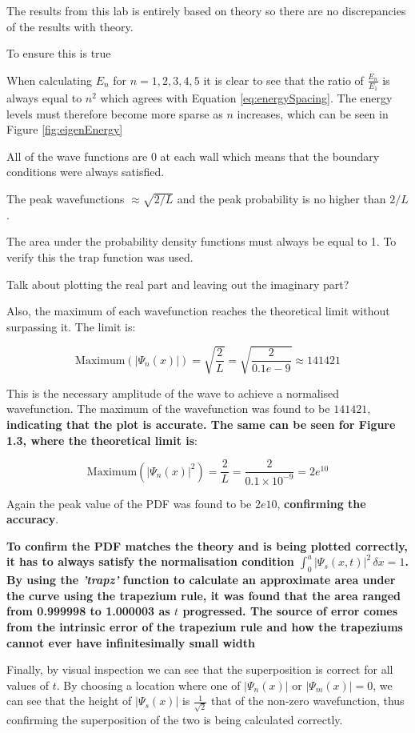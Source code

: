 The results from this lab is entirely based on theory so there are no discrepancies of the results with theory.

To ensure this is true 

When calculating $E_n$ for $n=1,2,3,4,5$ it is clear to see that the ratio of $\frac{E_n}{E_1}$ is always equal to $n^{2}$ which agrees with Equation \ref{eq:energySpacing}. The energy levels must therefore become more sparse as $n$ increases, which can be seen in Figure \ref{fig:eigenEnergy}

All of the wave functions are 0 at each wall which means that the boundary conditions were always satisfied.

The peak wavefunctions $\approx \sqrt{2/L}$ and the peak probability is no higher than $2/L$.

The area under the probability density functions must always be equal to 1. To verify this the trap function was used.

Talk about plotting the real part and leaving out the imaginary part?


Also, the maximum of each wavefunction reaches the theoretical limit without surpassing it. The limit is:

$$ \text{Maximum}(|\Psi_n(x)|) = \sqrt{\frac{2}{L}} = \sqrt{\frac{2}{0.1e-9}} \approx  141421 $$

This is the necessary amplitude of the wave to achieve a normalised wavefunction.
The maximum of the wavefunction was found to be $141421$, \textbf{indicating that the plot is accurate. The same can be seen for Figure 1.3, where the theoretical limit is}:

$$ \text{Maximum}(|\Psi_n(x)|^{2}) = \frac{2}{L} = \frac{2}{0.1 \times 10^{-9}} = 2e^{10} $$

Again the peak value of the PDF was found to be $2e10$, \textbf{confirming the accuracy}.

\textbf{To confirm the PDF matches the theory and is being plotted correctly, it has to always satisfy the normalisation condition $\int_{0}^{a} |\Psi_s(x,t)|^{2} \,\delta x = 1$. By using the \textit{'trapz'} function to calculate an approximate area under the curve using the trapezium rule, it was found that the area ranged from 0.999998 to 1.000003 as $t$ progressed. The source of error comes from the intrinsic error of the trapezium rule and how the trapeziums cannot ever have infinitesimally small width}

Finally, by visual inspection we can see that the superposition is correct for all values of $t$. By choosing a location where one of $|\Psi_n(x)|$ or $|\Psi_m(x)| = 0$, we can see that the height of $|\Psi_s(x)|$ is $\frac{1}{\sqrt{2}}$ that of the non-zero wavefunction, thus confirming the superposition of the two is being calculated correctly. 

